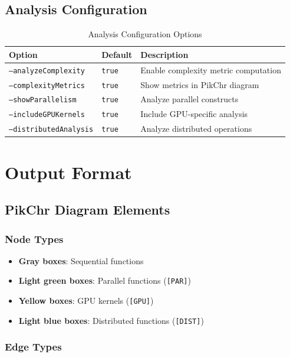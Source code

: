 \documentclass[11pt,a4paper]{article}
\begin{document}
\subsection{Analysis Configuration}

\begin{table}[H]
\centering
\begin{tabular}{@{}llp{6cm}@{}}
\toprule
\textbf{Option} & \textbf{Default} & \textbf{Description} \\
\midrule
\texttt{--analyzeComplexity} & \texttt{true} & Enable complexity metric computation \\
\texttt{--complexityMetrics} & \texttt{true} & Show metrics in PikChr diagram \\
\texttt{--showParallelism} & \texttt{true} & Analyze parallel constructs \\
\texttt{--includeGPUKernels} & \texttt{true} & Include GPU-specific analysis \\
\texttt{--distributedAnalysis} & \texttt{true} & Analyze distributed operations \\
\bottomrule
\end{tabular}
\caption{Analysis Configuration Options}
\end{table}

\section{Output Format}

\subsection{PikChr Diagram Elements}

\subsubsection{Node Types}

\begin{itemize}
    \item \textbf{Gray boxes}: Sequential functions
    \item \textbf{Light green boxes}: Parallel functions (\texttt{[PAR]})
    \item \textbf{Yellow boxes}: GPU kernels (\texttt{[GPU]})
    \item \textbf{Light blue boxes}: Distributed functions (\texttt{[DIST]})
\end{itemize}

\subsubsection{Edge Types}
\end{document}
